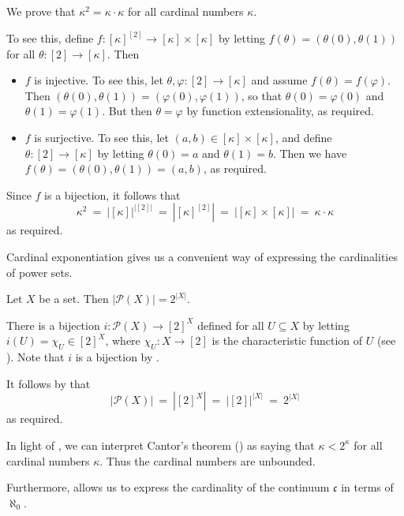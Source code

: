 \begin{example}
We prove that $\kappa^2 = \kappa \cdot \kappa$ for all cardinal numbers $\kappa$.

To see this, define $f : [\kappa]^{[2]} \to [\kappa] \times [\kappa]$ by letting $f(\theta) = (\theta(0), \theta(1))$ for all $\theta : [2] \to [\kappa]$. Then
\begin{itemize}
\item $f$ is injective. To see this, let $\theta, \varphi : [2] \to [\kappa]$ and assume $f(\theta) = f(\varphi)$. Then $(\theta(0), \theta(1)) = (\varphi(0), \varphi(1))$, so that $\theta(0) = \varphi(0)$ and $\theta(1) = \varphi(1)$. But then $\theta = \varphi$ by function extensionality, as required.
\item $f$ is surjective. To see this, let $(a,b) \in [\kappa] \times [\kappa]$, and define $\theta : [2] \to [\kappa]$ by letting $\theta(0)=a$ and $\theta(1)=b$. Then we have $f(\theta) = (\theta(0), \theta(1)) = (a,b)$, as required.
\end{itemize}
Since $f$ is a bijection, it follows that
\[ \kappa^2 ~=~ |[\kappa]|^{|[2]|} ~=~ |[\kappa]^{[2]}| ~=~ |[\kappa] \times [\kappa]| ~=~ \kappa \cdot \kappa \]
as required.
\end{example}

Cardinal exponentiation gives us a convenient way of expressing the cardinalities of power sets.

\begin{theorem}
\label{thmCardinalityOfPowerSet}
Let $X$ be a set. Then $|\mathcal{P}(X)| = 2^{|X|}$.
\end{theorem}

\begin{cproof}
There is a bijection $i : \mathcal{P}(X) \to [2]^{X}$ defined for all $U \subseteq X$ by letting $i(U) = \chi_U \in [2]^X$, where $\chi_U : X \to [2]$ is the characteristic function of $U$ (see ). Note that $i$ is a bijection by .

It follows by  that
\[ |\mathcal{P}(X)| ~=~ |[2]^X| ~=~ |[2]|^{|X|} ~=~ 2^{|X|} \]
as required.
\end{cproof}

In light of , we can interpret Cantor's theorem () as saying that $\kappa < 2^{\kappa}$ for all cardinal numbers $\kappa$. Thus the cardinal numbers are unbounded.

Furthermore,  allows us to express the cardinality of the continuum $\mathfrak{c}$ in terms of $\aleph_0$.


